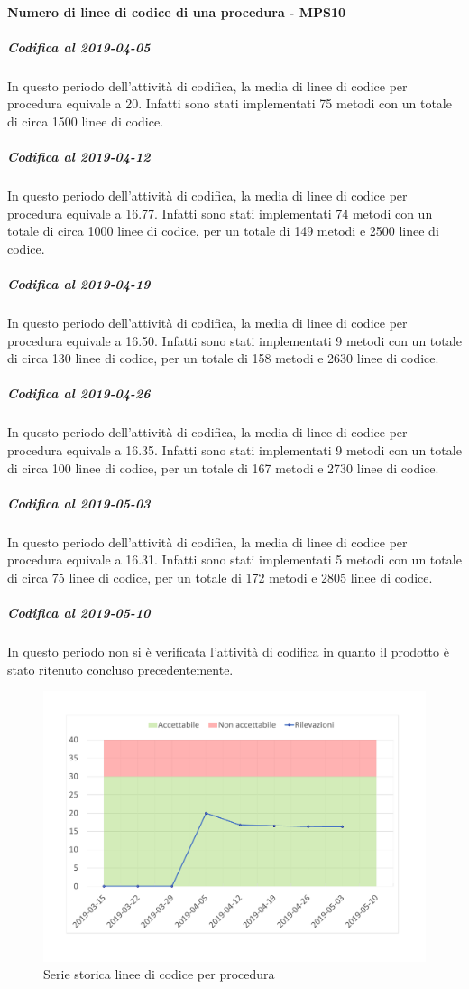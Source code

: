 \paragraph{Numero di linee di codice di una procedura - MPS10}
\subparagraph{Codifica al 2019-04-05}
In questo periodo dell'attività di codifica, la media di linee di codice per procedura equivale a 20. Infatti sono stati implementati 75 metodi con un totale di circa 1500 linee di codice.

\subparagraph{Codifica al 2019-04-12}
In questo periodo dell'attività di codifica, la media di linee di codice per procedura equivale a 16.77. Infatti sono stati implementati 74 metodi con un totale di circa 1000 linee di codice, per un totale di 149 metodi e 2500 linee di codice.

\subparagraph{Codifica al 2019-04-19}
In questo periodo dell'attività di codifica, la media di linee di codice per procedura equivale a 16.50. Infatti sono stati implementati 9 metodi con un totale di circa 130 linee di codice, per un totale di 158 metodi e 2630 linee di codice.

\subparagraph{Codifica al 2019-04-26}
In questo periodo dell'attività di codifica, la media di linee di codice per procedura equivale a 16.35. Infatti sono stati implementati 9 metodi con un totale di circa 100 linee di codice, per un totale di 167 metodi e 2730 linee di codice.

\subparagraph{Codifica al 2019-05-03}
In questo periodo dell'attività di codifica, la media di linee di codice per procedura equivale a 16.31. Infatti sono stati implementati 5 metodi con un totale di circa 75 linee di codice, per un totale di 172 metodi e 2805 linee di codice.

\subparagraph{Codifica al 2019-05-10}
In questo periodo non si è verificata l'attività di codifica in quanto il prodotto è stato ritenuto concluso precedentemente.

\begin{figure}[H]
	\centering
	\includegraphics[scale=0.6]{images/resoconto/MPS10Chart.pdf}
	\caption{Serie storica linee di codice per procedura}	
\end{figure}

